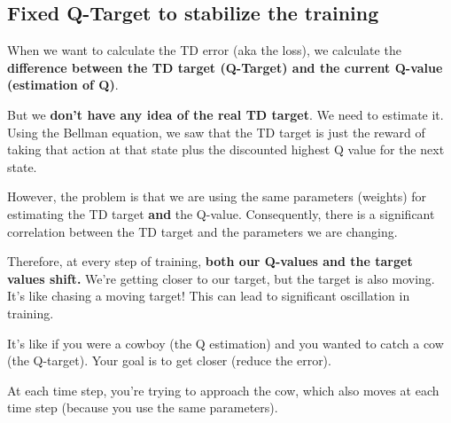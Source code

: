 \documentclass[11pt,a4paper]{article}
\begin{document}
\subsection{Fixed Q-Target to stabilize the training}\label{fixed-q-target-to-stabilize-the-training}

When we want to calculate the TD error (aka the loss), we calculate the \textbf{difference between the TD target (Q-Target) and the current Q-value (estimation of Q)}.

But we \textbf{don't have any idea of the real TD target}. We need to estimate it. Using the Bellman equation, we saw that the TD target is just the reward of taking that action at that state plus the discounted highest Q value for the next state.


However, the problem is that we are using the same parameters (weights) for estimating the TD target \textbf{and} the Q-value. Consequently, there is a significant correlation between the TD target and the parameters we are changing.

Therefore, at every step of training, \textbf{both our Q-values and the target values shift.} We're getting closer to our target, but the target is also moving. It's like chasing a moving target! This can lead to significant oscillation in training.

It's like if you were a cowboy (the Q estimation) and you wanted to catch a cow (the Q-target). Your goal is to get closer (reduce the error).


At each time step, you're trying to approach the cow, which also moves at each time step (because you use the same parameters).


\end{document}
